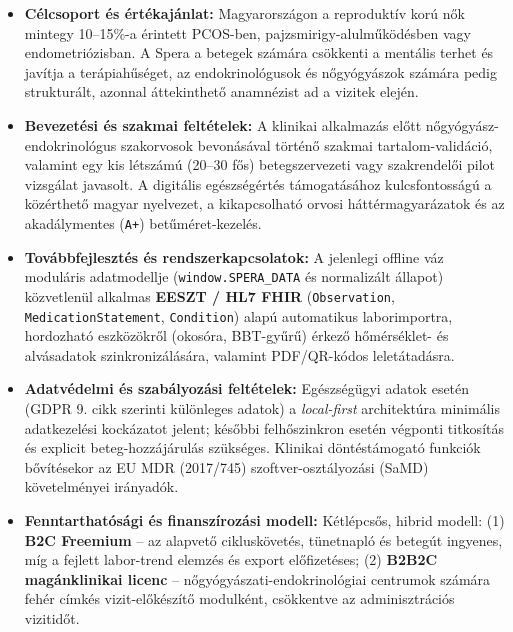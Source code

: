\documentclass[10pt,a4paper]{article}
\begin{document}
\begin{itemize}
  \item \textbf{Célcsoport és értékajánlat:} Magyarországon a reproduktív korú nők mintegy 10--15\%-a érintett PCOS-ben, pajzsmirigy-alulműködésben vagy endometriózisban. A Spera a betegek számára csökkenti a mentális terhet és javítja a terápiahűséget, az endokrinológusok és nőgyógyászok számára pedig strukturált, azonnal áttekinthető anamnézist ad a vizitek elején.
  \item \textbf{Bevezetési és szakmai feltételek:} A klinikai alkalmazás előtt nőgyógyász-endokrinológus szakorvosok bevonásával történő szakmai tartalom-validáció, valamint egy kis létszámú (20--30 fős) betegszervezeti vagy szakrendelői pilot vizsgálat javasolt. A digitális egészségértés támogatásához kulcsfontosságú a közérthető magyar nyelvezet, a kikapcsolható orvosi háttérmagyarázatok és az akadálymentes (\texttt{A+}) betűméret-kezelés.
  \item \textbf{Továbbfejlesztés és rendszerkapcsolatok:} A jelenlegi offline váz moduláris adatmodellje (\texttt{window.SPERA\_DATA} és normalizált állapot) közvetlenül alkalmas \textbf{EESZT / HL7 FHIR} (\texttt{Observation}, \texttt{MedicationStatement}, \texttt{Condition}) alapú automatikus laborimportra, hordozható eszközökről (okosóra, BBT-gyűrű) érkező hőmérséklet- és alvásadatok szinkronizálására, valamint PDF/QR-kódos leletátadásra.
  \item \textbf{Adatvédelmi és szabályozási feltételek:} Egészségügyi adatok esetén (GDPR 9. cikk szerinti különleges adatok) a \textit{local-first} architektúra minimális adatkezelési kockázatot jelent; későbbi felhőszinkron esetén végponti titkosítás és explicit beteg-hozzájárulás szükséges. Klinikai döntéstámogató funkciók bővítésekor az EU MDR (2017/745) szoftver-osztályozási (SaMD) követelményei irányadók.
  \item \textbf{Fenntarthatósági és finanszírozási modell:} Kétlépcsős, hibrid modell: (1) \textbf{B2C Freemium} -- az alapvető cikluskövetés, tünetnapló és betegút ingyenes, míg a fejlett labor-trend elemzés és export előfizetéses; (2) \textbf{B2B2C magánklinikai licenc} -- nőgyógyászati-endokrinológiai centrumok számára fehér címkés vizit-előkészítő modulként, csökkentve az adminisztrációs vizitidőt.
\end{itemize}
\end{document}
